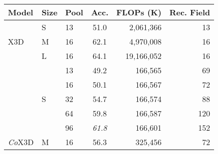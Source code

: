 \begin{table}[b!]
	\begin{center}
	
	\begin{tabular}{lllcrr}
		\toprule
		\textbf{Model}  & \textbf{Size} & \textbf{Pool} & \textbf{Acc.} & \textbf{FLOPs (K)} & \textbf{Rec. Field} \\
		\midrule
		\multirow{3}{*}{X3D} 
		                & S             & 13            & 51.0          & 2,061,366 %
		                                                                                    & 13                 \\
		                & M             & 16            & 62.1          & 4,970,008 %
		                                                                                    & 16                 \\
		                & L             & 16            & 64.1          & 19,166,052 %
		                                                                                    & 16                 \\
		\midrule
		    &\multirow{5}{*}{S}         & 13            & 49.2          & 166,565 %
		                                                                                    & 69                 \\
		                &               & 16            & 50.1          & 166,567 %
		                                                                                    & 72                 \\
		                &               & 32            & 54.7          & 166,574 %
		                                                                                    & 88                 \\
		                &               & 64            & 59.8          & 166,587 %
		                                                                                    & 120                \\
		                &               & 96            &\textit{61.8}  & 166,601 %
		                                                                                    & 152                \\
		                \cline{2-6}
 		\multirow{4}{*}{\textit{Co}X3D}
		    &\multirow{4}{*}{M}         & 16            & 56.3          & 325,456 %
		                                                                                    & 72                 \\

\end{tabular}
\end{center}
\end{table}
